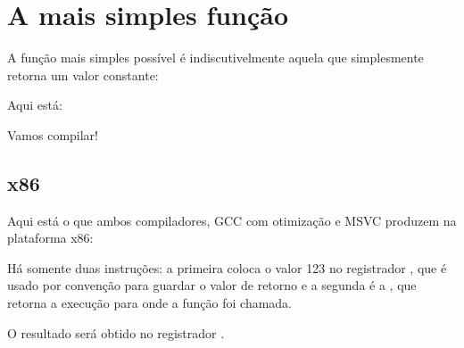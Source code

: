 \chapter{A mais simples função}

A função mais simples possível é indiscutivelmente aquela que simplesmente retorna um valor constante:

Aqui está:



Vamos compilar!

\section{x86}

Aqui está o que ambos compiladores, GCC com otimização e MSVC produzem na plataforma x86:



Há somente duas instruções: a primeira coloca o valor 123 no registrador \EAX, que é usado por convenção para guardar o valor de retorno e a segunda é a \RET, que retorna a execução para onde a função foi chamada.

O resultado será obtido no registrador \EAX.


